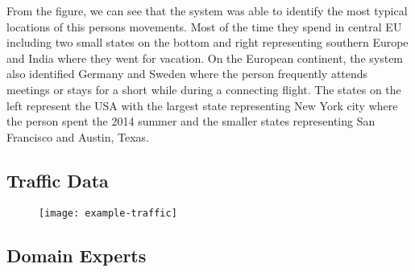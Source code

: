 From the figure, we can see that the system was able to identify the most typical locations of this persons
movements. Most of the time they spend in central EU including two small states on the bottom and right
representing southern Europe and India where they went for vacation. On the European continent, the system
also identified Germany and Sweden where the person frequently attends meetings or stays for a short while
during a connecting flight. The states on the left represent the USA with the largest state representing New
York city where the person spent the 2014 summer and the smaller states representing San Francisco and Austin,
Texas.

\subsection{Traffic Data}

\begin{figure}[h!]
	\centering
	\texttt{[image: example-traffic]}
	\caption{}
	\label{fig:example-traffic}
\end{figure}

\subsection{Domain Experts}